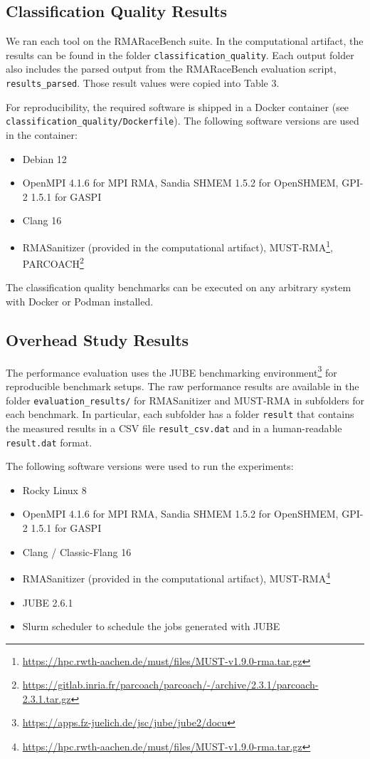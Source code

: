 \documentclass[twoside]{article}
\begin{document}
\subsection*{Classification Quality Results}
We ran each tool on the RMARaceBench suite. 
In the computational artifact, the results can be found in the folder \texttt{classification\_quality}.
Each output folder also includes the parsed output from the RMARaceBench evaluation script, \texttt{results\_parsed}.
Those result values were copied into Table 3.

For reproducibility, the required software is shipped in a Docker container (see \texttt{classification\_quality/Dockerfile}). The following software versions are used in the container:
\begin{itemize}
\item Debian 12
\item OpenMPI 4.1.6 for MPI RMA, Sandia SHMEM 1.5.2 for OpenSHMEM, GPI-2 1.5.1 for GASPI
\item Clang 16
\item RMASanitizer (provided in the computational artifact), MUST-RMA\footnote{\url{https://hpc.rwth-aachen.de/must/files/MUST-v1.9.0-rma.tar.gz}}, PARCOACH\footnote{\url{https://gitlab.inria.fr/parcoach/parcoach/-/archive/2.3.1/parcoach-2.3.1.tar.gz}}
\end{itemize}

The classification quality benchmarks can be executed on any arbitrary system with Docker or Podman installed.


\subsection*{Overhead Study Results}
The performance evaluation uses the JUBE benchmarking environment\footnote{\url{https://apps.fz-juelich.de/jsc/jube/jube2/docu}} for reproducible benchmark setups.
The raw performance results are available in the folder \texttt{evaluation\_results/} for RMASanitizer and MUST-RMA in subfolders for each benchmark. In particular, each subfolder has a folder  \texttt{result} that contains the measured results in a CSV file \texttt{result\_csv.dat} and in a human-readable \texttt{result.dat} format.

The following software versions were used to run the experiments:
\begin{itemize}
\item Rocky Linux 8
\item OpenMPI 4.1.6 for MPI RMA, Sandia SHMEM 1.5.2 for OpenSHMEM, GPI-2 1.5.1 for GASPI
\item Clang / Classic-Flang 16
\item RMASanitizer (provided in the computational artifact), MUST-RMA\footnote{\url{https://hpc.rwth-aachen.de/must/files/MUST-v1.9.0-rma.tar.gz}}
\item JUBE 2.6.1
\item Slurm scheduler to schedule the jobs generated with JUBE
\end{itemize}
\end{document}
